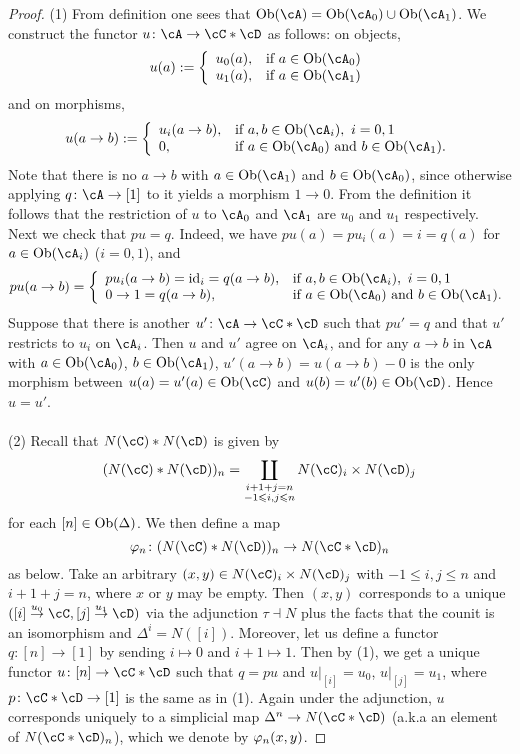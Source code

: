 \documentclass[a4paper,11pt,openany]{scrartcl}
\begin{document}
\begin{proof}
(1) From definition one sees that $\Ob(\cA)=\Ob(\cA_0)\cup\Ob(\cA_1)$. We construct the functor $u\colon\cA\to\cC*\cD$ as follows: on objects, 
\[
u(a):=\left\{
\begin{array}{ll}
u_0(a),&\text{if }a\in\Ob(\cA_0)\\
u_1(a),&\text{if }a\in\Ob(\cA_1)
\end{array}
\right.
\]
and on morphisms,
\[
u(a\to b):=\left\{
\begin{array}{ll}
u_i(a\to b),&\text{if } a,b\in\Ob(\cA_i),\ i=0,1\\
0,&\text{if $a\in\Ob(\cA_0)$ and $b\in\Ob(\cA_1)$}.
\end{array}
\right.
\]
Note that there is no $a\to b$ with $a\in\Ob(\cA_1)$ and $b\in\Ob(\cA_0)$, since otherwise applying $q\colon\cA\to[1]$ to it yields a morphism $1\to0$. From the definition it follows that the restriction of $u$ to $\cA_0$ and $\cA_1$ are $u_0$ and $u_1$ respectively. Next we check that $pu=q$. Indeed, we have $pu(a)=pu_i(a)=i=q(a)$ for $a\in\Ob(\cA_i)$ ($i=0,1$), and
\[
pu(a\to b)=\left\{
\begin{array}{ll}
pu_i(a\to b)=\id_i=q(a\to b),&\text{if }a,b\in\Ob(\cA_i),\ i=0,1\\
0\to 1=q(a\to b),&\text{if }a\in\Ob(\cA_0)\text{ and }b\in\Ob(\cA_1).
\end{array}
\right.
\]
Suppose that there is another $u'\colon\cA\to\cC*\cD$ such that $pu'=q$ and that $u'$ restricts to $u_i$ on $\cA_i$. Then $u$ and $u'$ agree on $\cA_i$, and for any $a\to b$ in $\cA$ with $a\in\Ob(\cA_0)$, $b\in\Ob(\cA_1)$, $u'(a\to b)=u(a\to b)-0$ is the only morphism between $u(a)=u'(a)\in\Ob(\cC)$ and $u(b)=u'(b)\in\Ob(\cD)$. Hence $u=u'$.\\
\\
(2) Recall that $N(\cC)*N(\cD)$ is given by
\[
(N(\cC)*N(\cD))_n=\coprod_{\substack{i+1+j=n\\-1\leqslant i,j\leqslant n}}N(\cC)_i\times N(\cD)_j
\]
for each $[n]\in\operatorname{Ob}(\Delta)$. We then define a map
\[
\f_n\colon (N(\cC)*N(\cD))_n\to N(\cC*\cD)_n
\]
as below. Take an arbitrary $(x,y)\in N(\cC)_i\times N(\cD)_j$ with $-1\leqslant i,j\leqslant n$ and $i+1+j=n$, where $x$ or $y$ may be empty. Then $(x,y)$ corresponds to a unique $([i]\overset{u_0}{\to}\cC,[j]\overset{u_1}{\to}\cD)$ via the adjunction $\tau\dashv N$ plus the facts that the counit is an isomorphism and $\Delta^i=N([i])$. Moreover, let us define a functor $q\colon[n]\to[1]$ by sending $i\mapsto0$ and $i+1\mapsto 1$. Then by (1), we get a unique functor $u\colon[n]\to\cC*\cD$ such that $q=pu$ and $u|_{[i]}=u_0$, $u|_{[j]}=u_1$, where $p\colon\cC*\cD\to[1]$ is the same as in (1). Again under the adjunction, $u$ corresponds uniquely to a simplicial map $\Delta^n\to N(\cC*\cD)$ (a.k.a an element of $N(\cC*\cD)_n$), which we denote by $\varphi_n(x,y)$.


\end{proof}
\end{document}
